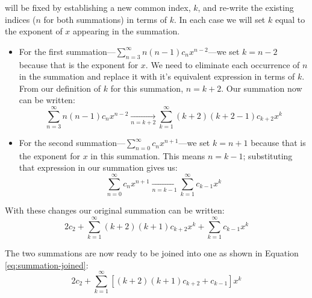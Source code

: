  will be fixed by establishing a new common index, $k$, and re-write the existing indices ($n$ for both summations) in terms of $k$.  In each case we will set $k$ equal to the exponent of $x$ appearing in the summation.
\begin{itemize}
\item For the first summation---$\sum\limits_{n=3}^{\infty} n(n-1)c_nx^{n-2}$---we set $k=n-2$ because that is the exponent for $x$. We need to eliminate each occurrence of $n$ in the summation and replace it with it's equivalent expression in terms of $k$.  From our definition of $k$ for this summation, $n=k+2$. Our summation now can be written:
$$\sum\limits_{n=3}^{\infty} n(n-1)c_nx^{n-2} \xrightarrow[n=k+2]{} \sum\limits_{k=1}^{\infty} (k+2)(k+2-1)c_{k+2}x^k$$ 

\item For the second summation---$\sum\limits_{n=0}^{\infty} c_n x^{n+1}$---we set $k=n+1$ because that is the exponent for $x$ in this summation.  This means $n=k-1$; substituting that expression in our summation gives us:
$$\sum\limits_{n=0}^{\infty} c_nx^{n+1} \xrightarrow[n=k-1]{}\sum\limits_{k=1}^{\infty}c_{k-1}x^{k}$$
\end{itemize}

With these changes our original summation can be written:
\begin{equation}
2c_2 + \sum\limits_{k=1}^{\infty} (k+2)(k+1)c_{k+2}x^k + \sum\limits_{k=1}^{\infty}c_{k-1}x^{k}
\end{equation}

The two summations are now ready to be joined into one as shown in Equation \ref{eq:summation-joined}:
\begin{equation}
2c_2 + \sum\limits_{k=1}^{\infty} \left[(k+2)(k+1)c_{k+2} + c_{k-1}\right] x^{k}
\label{eq:summation-joined}
\end{equation}

